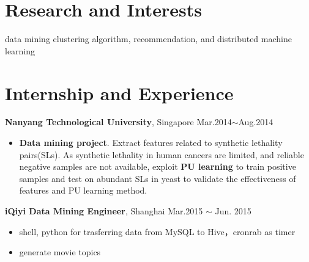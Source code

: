 \documentclass[margin]{res}
\begin{document}
\begin{resume}
\section{Research and Interests}
data mining clustering algorithm, recommendation, and distributed machine learning



\section{Internship and Experience}
\textbf{Nanyang Technological University}, Singapore \hfill Mar.2014$\sim$Aug.2014
\begin{itemize}
\item \textbf{Data mining project}. Extract features related to synthetic lethality pairs(SLs). As synthetic lethality in human cancers are limited, and reliable negative samples are not available, exploit \textbf{PU learning} to train positive samples and test on abundant SLs in yeast to validate the effectiveness of features and PU learning method.
\end{itemize}
\begin{spacing}{1.5}
\end{spacing}
\textbf{iQiyi Data Mining Engineer}, Shanghai \hfill Mar.2015 $\sim$ Jun. 2015
\begin{itemize}
\item shell, python for trasferring data from MySQL to Hive，cronrab as timer
\item generate movie topics
\end{itemize}


\end{resume}
\end{document}
